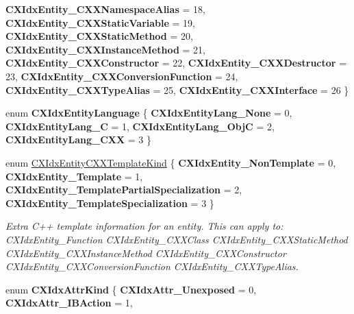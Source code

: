 \begin{DoxyCompactItemize}
{\bfseries C\+X\+Idx\+Entity\+\_\+\+C\+X\+X\+Namespace\+Alias} = 18, 
{\bfseries C\+X\+Idx\+Entity\+\_\+\+C\+X\+X\+Static\+Variable} = 19, 
\newline
{\bfseries C\+X\+Idx\+Entity\+\_\+\+C\+X\+X\+Static\+Method} = 20, 
{\bfseries C\+X\+Idx\+Entity\+\_\+\+C\+X\+X\+Instance\+Method} = 21, 
{\bfseries C\+X\+Idx\+Entity\+\_\+\+C\+X\+X\+Constructor} = 22, 
{\bfseries C\+X\+Idx\+Entity\+\_\+\+C\+X\+X\+Destructor} = 23, 
\newline
{\bfseries C\+X\+Idx\+Entity\+\_\+\+C\+X\+X\+Conversion\+Function} = 24, 
{\bfseries C\+X\+Idx\+Entity\+\_\+\+C\+X\+X\+Type\+Alias} = 25, 
{\bfseries C\+X\+Idx\+Entity\+\_\+\+C\+X\+X\+Interface} = 26
 \}
\item 
\mbox{\label{group__CINDEX__HIGH_ga586068b110ab11094f40eff0b92fc578}} 
enum {\bfseries C\+X\+Idx\+Entity\+Language} \{ {\bfseries C\+X\+Idx\+Entity\+Lang\+\_\+\+None} = 0, 
{\bfseries C\+X\+Idx\+Entity\+Lang\+\_\+C} = 1, 
{\bfseries C\+X\+Idx\+Entity\+Lang\+\_\+\+ObjC} = 2, 
{\bfseries C\+X\+Idx\+Entity\+Lang\+\_\+\+C\+XX} = 3
 \}
\item 
\mbox{\label{group__CINDEX__HIGH_gaffb304a99b36f147738b3349e7aa22cb}} 
enum \mbox{\hyperlink{group__CINDEX__HIGH_gaffb304a99b36f147738b3349e7aa22cb}{C\+X\+Idx\+Entity\+C\+X\+X\+Template\+Kind}} \{ {\bfseries C\+X\+Idx\+Entity\+\_\+\+Non\+Template} = 0, 
{\bfseries C\+X\+Idx\+Entity\+\_\+\+Template} = 1, 
{\bfseries C\+X\+Idx\+Entity\+\_\+\+Template\+Partial\+Specialization} = 2, 
{\bfseries C\+X\+Idx\+Entity\+\_\+\+Template\+Specialization} = 3
 \}
\begin{DoxyCompactList}\small\item\em Extra C++ template information for an entity. This can apply to\+: C\+X\+Idx\+Entity\+\_\+\+Function C\+X\+Idx\+Entity\+\_\+\+C\+X\+X\+Class C\+X\+Idx\+Entity\+\_\+\+C\+X\+X\+Static\+Method C\+X\+Idx\+Entity\+\_\+\+C\+X\+X\+Instance\+Method C\+X\+Idx\+Entity\+\_\+\+C\+X\+X\+Constructor C\+X\+Idx\+Entity\+\_\+\+C\+X\+X\+Conversion\+Function C\+X\+Idx\+Entity\+\_\+\+C\+X\+X\+Type\+Alias. \end{DoxyCompactList}\item 
\mbox{\label{group__CINDEX__HIGH_gacafef874c0a53de1d38805ec7ca9790a}} 
enum {\bfseries C\+X\+Idx\+Attr\+Kind} \{ {\bfseries C\+X\+Idx\+Attr\+\_\+\+Unexposed} = 0, 
{\bfseries C\+X\+Idx\+Attr\+\_\+\+I\+B\+Action} = 1, 

\end{DoxyCompactItemize}
